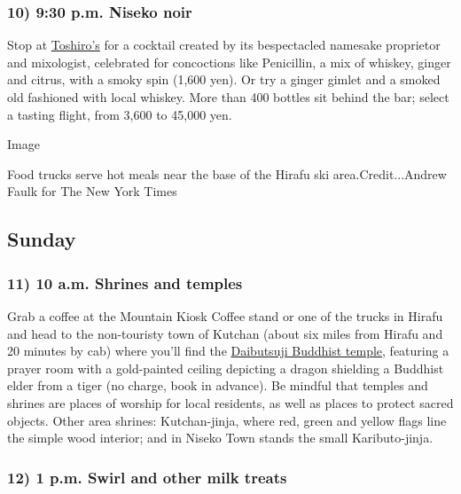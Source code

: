 \hypertarget{10-930-pm-niseko-noir}{%
\subsubsection{10) 9:30 p.m. Niseko noir}\label{10-930-pm-niseko-noir}}

Stop at \href{http://toshiros-bar.com}{Toshiro's} for a cocktail created
by its bespectacled namesake proprietor and mixologist, celebrated for
concoctions like Penicillin, a mix of whiskey, ginger and citrus, with a
smoky spin (1,600 yen). Or try a ginger gimlet and a smoked old
fashioned with local whiskey. More than 400 bottles sit behind the bar;
select a tasting flight, from 3,600 to 45,000 yen.

Image

Food trucks serve hot meals near the base of the Hirafu ski
area.Credit...Andrew Faulk for The New York Times

\hypertarget{sunday}{%
\subsection{Sunday}\label{sunday}}

\hypertarget{11-10-am-shrines-and-temples}{%
\subsubsection{11) 10 a.m. Shrines and
temples}\label{11-10-am-shrines-and-temples}}

Grab a coffee at the Mountain Kiosk Coffee stand or one of the trucks in
Hirafu and head to the non-touristy town of Kutchan (about six miles
from Hirafu and 20 minutes by cab) where you'll find the
\href{http://visitniseko.tourismbuilder.com}{Daibutsuji Buddhist
temple}, featuring a prayer room with a gold-painted ceiling depicting a
dragon shielding a Buddhist elder from a tiger (no charge, book in
advance). Be mindful that temples and shrines are places of worship for
local residents, as well as places to protect sacred objects. Other area
shrines: Kutchan-jinja, where red, green and yellow flags line the
simple wood interior; and in Niseko Town stands the small
Kaributo-jinja.

\hypertarget{12-1-pm-swirl-and-other-milk-treats}{%
\subsubsection{12) 1 p.m. Swirl and other milk
treats}\label{12-1-pm-swirl-and-other-milk-treats}}

